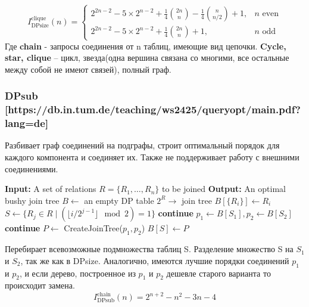 \documentclass[12pt]{article}
\begin{document}
\begin{flushleft}
\[
I^{\text{clique}}_{\text{DPsize}}(n) =
\begin{cases}
    2^{2n-2} - 5 \times 2^{n-2} + \frac{1}{4} \binom{2n}{n} - \frac{1}{4} \binom{n}{n/2} + 1, & n \text{ even} \\
    2^{2n-2} - 5 \times 2^{n-2} + \frac{1}{4} \binom{2n}{n} + 1, & n \text{ odd}
\end{cases}
\]
Где \textbf{chain} - запросы соединения от n таблиц, имеющие вид цепочки. 
\textbf{Cycle, star, clique} -- цикл, звезда(одна вершина связана со многими, все остальные
между собой не имеют связей), полный граф.
\centering \subsubsection*{DPsub [https://db.in.tum.de/teaching/ws2425/queryopt/main.pdf?lang=de]} 
\raggedright
Разбивает граф соединений на подграфы, строит оптимальный порядок для каждого
компонента и соединяет их. Также не поддерживает работу с внешними соединениями.
\begin{algorithm}
    \begin{algorithmic}[1]
        \State \textbf{Input:} A set of relations $R = \{R_1, \dots, R_n\}$ to be joined
        \State \textbf{Output:} An optimal bushy join tree
        \State $B \gets$ an empty DP table $2^R \to$ join tree
            \State $B[\{R_i\}] \gets R_i$
        \EndFor
            \State $S \gets \{ R_j \in R \mid ( \lfloor i / 2^{j-1} \rfloor \mod 2) = 1 \}$
                    \State \textbf{continue}
                \EndIf
                \State $p_1 \gets B[S_1], p_2 \gets B[S_2]$
                 \textbf{continue} \EndIf
                \State $P \gets$ CreateJoinTree($p_1, p_2$)
                    \State $B[S] \gets P$
                \EndIf
            \EndFor
        \EndFor
    \end{algorithmic}
\end{algorithm}
Перебирает всевозможные подмножества таблиц S. Разделение множество S на  $S_1$ и $S_2$, 
так же как в DPsize. Аналогично, имеются лучшие порядки соединений $p_1$ и $p_2$, 
и если дерево, построенное из $p_1$ и $p_2$ дешевле старого варианта то происходит 
замена.
\[
I^{\text{chain}}_{\text{DPsub}}(n) =
2^{n+2} - n^{2} - 3n - 4
\]


\end{flushleft}
\end{document}
